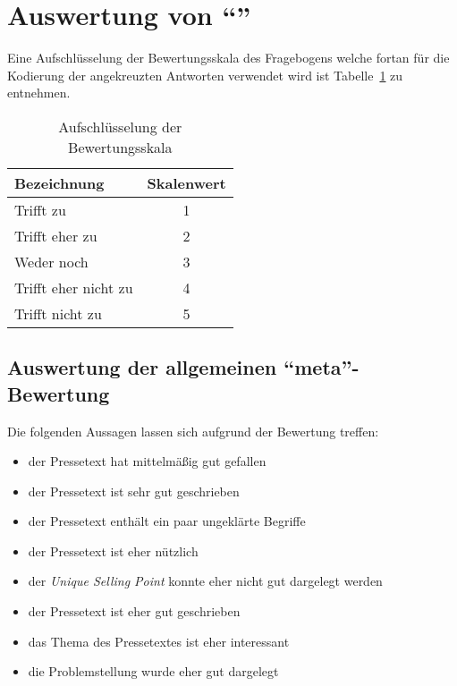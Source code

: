 


 





\section{Auswertung von \enquote{\varpressetext}}

Eine Aufschlüsselung der Bewertungsskala des Fragebogens welche fortan für die
Kodierung der angekreuzten Antworten verwendet wird ist
Tabelle~\ref{tab:skala} zu entnehmen.

\begin{table}[!ht]
    \caption{Aufschlüsselung der Bewertungsskala}
    \label{tab:skala}
    \begin{center}
        \begin{tabular}{lc}
        \toprule
        \textbf{Bezeichnung} & \textbf{Skalenwert} \\
        \midrule
        Trifft zu & 1 \\
        Trifft eher zu & 2 \\
        Weder noch & 3 \\
        Trifft eher nicht zu & 4 \\
        Trifft nicht zu & 5 \\
        \bottomrule
        \end{tabular}
    \end{center}
\end{table}

\subsection{Auswertung der allgemeinen \enquote{meta}-Bewertung}

Die folgenden Aussagen lassen sich aufgrund der Bewertung treffen:

\begin{itemize}
    \item der Pressetext hat mittelmäßig gut gefallen
    \item der Pressetext ist sehr gut geschrieben
    \item der Pressetext enthält ein paar ungeklärte Begriffe
    \item der Pressetext ist eher nützlich
    \item der \emph{Unique Selling Point} konnte eher nicht gut dargelegt werden
    \item der Pressetext ist eher gut geschrieben
    \item das Thema des Pressetextes ist eher interessant
    \item die Problemstellung wurde eher gut dargelegt
\end{itemize}

